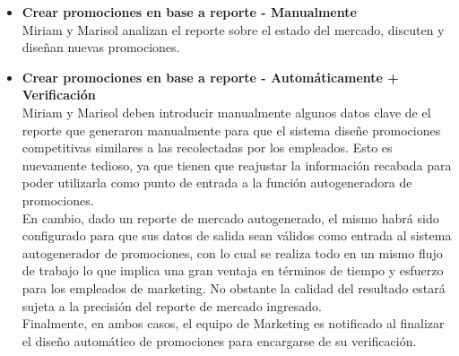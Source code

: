 \begin{itemize}
  \begin{itemize}
    \item \textbf{Crear promociones en base a reporte - Manualmente} \\
      Miriam y Marisol analizan el reporte sobre el estado del mercado, discuten y diseñan nuevas promociones.
    \item \textbf{Crear promociones en base a reporte - Automáticamente + Verificación} \\
      Miriam y Marisol deben introducir manualmente algunos datos clave de el reporte que generaron manualmente para que el sistema diseñe promociones competitivas similares a las recolectadas por los empleados. Esto es nuevamente tedioso, ya que tienen que reajustar la información recabada para poder utilizarla como punto de entrada a la función autogeneradora de promociones.\\
      En cambio, dado un reporte de mercado autogenerado, el mismo habrá sido configurado para que sus datos de salida sean válidos como entrada al sistema autogenerador de promociones, con lo cual se realiza todo en un mismo flujo de trabajo lo que implica una gran ventaja en términos de tiempo y esfuerzo para los empleados de marketing. No obstante la calidad del resultado estará sujeta a la precisión del reporte de mercado ingresado.\\
Finalmente, en ambos casos, el equipo de Marketing es notificado al finalizar el diseño automático de promociones para encargarse de su verificación.
  \end{itemize}


\end{itemize}
